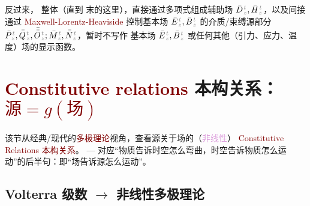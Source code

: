 反过来， 整体（直到  末的这里），直接通过多项式组成\textcolor{NavyBlue}{辅助场} $\bar{D}^{\;\!\mathcolor{gray}{t}}_{\;\!\mathcolor{gray}{z}}, \bar{H}^{\;\!\mathcolor{gray}{t}}_{\;\!\mathcolor{gray}{z}}$，以及间接通过 \textcolor{Maroon}{Maxwell-Lorentz-Heaviside}  控制\textcolor{NavyBlue}{基本场} $\bar{E}^{\;\!\mathcolor{gray}{t}}_{\;\!\mathcolor{gray}{z}}, \bar{B}^{\;\!\mathcolor{gray}{t}}_{\;\!\mathcolor{gray}{z}}$ 的介质/束缚源部分 $\bar{P}^{\;\!\mathcolor{gray}{t}}_{\;\!\mathcolor{gray}{z}},\bar{\bar{Q}}^{\;\!\mathcolor{gray}{t}}_{\;\!\mathcolor{gray}{z}},\bar{\bar{\bar{O}}}^{\;\!\mathcolor{gray}{t}}_{\;\!\mathcolor{gray}{z}} ; \bar{M}^{\;\!\mathcolor{gray}{t}}_{\;\!\mathcolor{gray}{z}}, \bar{\bar{N}}^{\;\!\mathcolor{gray}{t}}_{\;\!\mathcolor{gray}{z}}$，暂时不写作 \textcolor{NavyBlue}{基本场} $\bar{E}^{\;\!\mathcolor{gray}{t}}_{\;\!\mathcolor{gray}{z}}, \bar{B}^{\;\!\mathcolor{gray}{t}}_{\;\!\mathcolor{gray}{z}}$ 或任何其他（引力、应力、温度）场的显示函数。

\section{\textcolor{Maroon}{Constitutive relations} 本构关系：\textcolor{Maroon}{$\text{源} = g(\text{场})$}}\label{sec:constitutive}

该节从经典/现代的\textcolor{Maroon}{多极理论}视角，查看源关于场的（\textcolor{Plum}{非线性}） \textcolor{Maroon}{Constitutive Relations} \textcolor{Maroon}{本构关系}。 --- 对应“物质告诉时空怎么弯曲，时空告诉物质怎么运动”的后半句：即“场告诉源怎么运动”。

\vspace*{-4.0em}

\subsection{Volterra 级数 $\longrightarrow$ 非线性多极理论}\label{ssec:PMQN-nonlinear}

